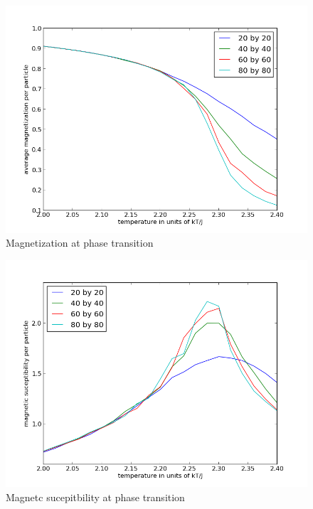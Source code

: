 \documentclass[a4paper,english, 10pt, twoside]{article}
\begin{document}
 \begin{figure}[H]
  \centering
 \includegraphics[scale=0.5]{magnetization.png}
 \caption{Magnetization at phase transition}
\label{M_transition}
 \end{figure} 
 
  \begin{figure}[H]
  \centering
 \includegraphics[scale=0.5]{magnetic_suceptibility.png}
 \caption{Magnetc sucepitbility at phase transition}
\label{magnetic_suceptibility}
 \end{figure} 
 
\end{document}
